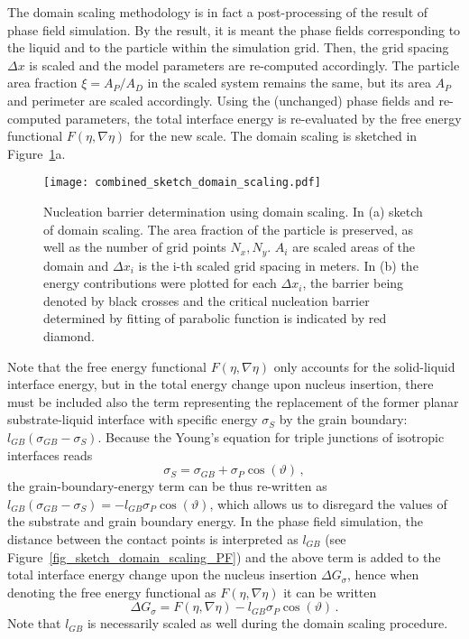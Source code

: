 The domain scaling methodology is in fact a post-processing of the result of phase field simulation. By the result, it is meant the phase fields corresponding to the liquid and to the particle within the simulation grid. Then, the grid spacing $\Delta x$ is scaled and the model parameters are re-computed accordingly. The particle area fraction $\xi=A_P/A_D$ in the scaled system remains the same, but its area $A_P$ and perimeter are scaled accordingly. Using the (unchanged) phase fields and re-computed parameters, the total interface energy is re-evaluated by the free energy functional $F(\eta,\nabla\eta)$ for the new scale. The domain scaling is sketched in Figure~\ref{fig_domain_scaling}a. 

\begin{figure}
	\centering
	\texttt{[image: combined\_sketch\_domain\_scaling.pdf]}
	\caption[Nucleation barrier determination using domain scaling]{Nucleation barrier determination using domain scaling. In (a) sketch of domain scaling. The area fraction of the particle is preserved, as well as the number of grid points $N_x, N_y$. $A_i$ are scaled areas of the domain and $\Delta x_i$ is the i-th scaled grid spacing in meters. In (b) the energy contributions were plotted for each $\Delta x_i$, the barrier being denoted by black crosses and the critical nucleation barrier determined by fitting of parabolic function is indicated by red diamond.}
	\label{fig_domain_scaling}
\end{figure}	

Note that the free energy functional $F(\eta,\nabla\eta)$ only accounts for the solid-liquid interface energy, but in the total energy change upon nucleus insertion, there must be included also the term representing the replacement of the former planar substrate-liquid interface with specific energy $\sigma_S$ by the grain boundary: $l_{GB}(\sigma_{GB}-\sigma_S)$. Because the Young's equation for triple junctions of isotropic interfaces reads
\begin{equation}\label{eq_young_iso}
	\sigma_S = \sigma_{GB}+\sigma_P\cos(\vartheta) \,,
\end{equation}
the grain-boundary-energy term can be thus re-written as $l_{GB}(\sigma_{GB}-\sigma_S)=-l_{GB}\sigma_P\cos(\vartheta)$, which allows us to disregard the values of the substrate and grain boundary energy. In the phase field simulation, the distance between the contact points is interpreted as $l_{GB}$ (see Figure~\ref{fig_sketch_domain_scaling_PF}) and the above term is added to the total interface energy change upon the nucleus insertion $\Delta G_\sigma$, hence when denoting the free energy functional as $F(\eta,\nabla\eta)$ it can be written
\begin{equation}
	\Delta G_\sigma = F(\eta,\nabla\eta) - l_{GB}\sigma_P\cos(\vartheta) \,.
\end{equation}
Note that $l_{GB}$ is necessarily scaled as well during the domain scaling procedure.

